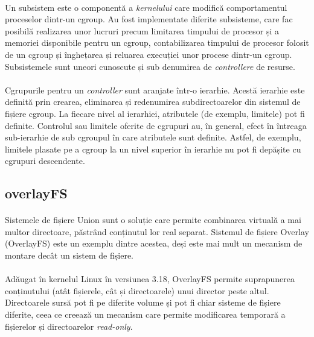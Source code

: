         \paragraph{} Un subsistem este o componentă a \textit{kernelului} care modifică comportamentul proceselor dintr-un cgroup. Au fost implementate diferite subsisteme, care fac posibilă realizarea unor lucruri precum limitarea timpului de procesor și a memoriei disponibile pentru un cgroup, contabilizarea timpului de procesor folosit de un cgroup și înghețarea și reluarea execuției unor procese dintr-un cgroup. Subsistemele sunt uneori cunoscute și sub denumirea de \textit{controllere} de resurse. \cite{cg:man}
        \paragraph{} Cgrupurile pentru un \textit{controller} sunt aranjate într-o ierarhie. Acestă ierarhie este definită prin crearea, eliminarea și redenumirea subdirectoarelor din sistemul de fișiere cgroup. La fiecare nivel al ierarhiei, atributele (de exemplu, limitele) pot fi definite. Controlul sau limitele oferite de cgrupuri au, în general, efect în întreaga sub-ierarhie de sub cgroupul în care atributele sunt definite. Astfel, de exemplu, limitele plasate pe a cgroup la un nivel superior în ierarhie nu pot fi depășite cu cgrupuri descendente. \cite{cg:man}

    \subsection{overlayFS}
        \paragraph{} Sistemele de fișiere Union sunt o soluție care permite combinarea virtuală a mai multor directoare, păstrând conținutul lor real separat. Sistemul de fișiere Overlay (OverlayFS) este un exemplu dintre acestea, deși este mai mult un mecanism de montare decât un sistem de fișiere. \cite{ofs:artic}
        \paragraph{} Adăugat în kernelul Linux în versiunea 3.18, OverlayFS permite suprapunerea conți\-nutului (atât fișierele, cât și directoarele) unui director peste altul. Directoarele sursă pot fi pe diferite volume și pot fi chiar sisteme de fișiere diferite, ceea ce creează un mecanism care permite modificarea temporară a fișierelor și directoarelor \textit{read-only}. \cite{ofs:artic}
